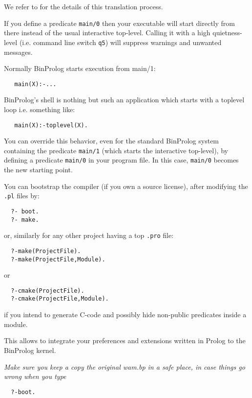 \documentclass{article}
\begin{document}
We refer to \cite{tdb95rev}
for the details of this translation process.

If you define a predicate {\tt main/0} then your
executable will start directly from there instead
of the usual interactive top-level. Calling it with a high
quietness-level (i.e. command line switch {\tt \-q5}) will
suppress warnings and unwanted messages.

{\flushleft Normally} BinProlog starts execution from main/1:

\begin{verbatim}
   main(X):-...
\end{verbatim}

{\flushleft BinProlog's} shell
is nothing but such an application which
starts with a toplevel loop i.e. something like:

\begin{verbatim}
   main(X):-toplevel(X).
\end{verbatim}

{\flushleft You} can override this behavior, even
for the standard BinProlog system containing the predicate {\tt main/1} (which
starts the interactive top-level), by defining a predicate {\tt main/0} in your
program file. In this case, {\tt main/0} becomes the new starting point.

{\flushleft You} can bootstrap the compiler (if you own a source license), after modifying the 
{\tt *.pl} files by:

\begin{verbatim}
  ?- boot.
  ?- make.
\end{verbatim}

or, similarly for any other project having a top {\tt *.pro} file:

\begin{verbatim}
  ?-make(ProjectFile).
  ?-make(ProjectFile,Module).
\end{verbatim}

or

\begin{verbatim}
  ?-cmake(ProjectFile).
  ?-cmake(ProjectFile,Module).
\end{verbatim}

if you intend to generate C-code and possibly hide non-public predicates
inside a module.

{\flushleft This} allows to integrate your preferences and extensions
written in Prolog to the BinProlog kernel.

{\em {\flushleft Make} sure you keep a copy the original 
{\em wam.bp} in a safe place, in case things go wrong when you type}
\begin{verbatim}
  ?-boot.
\end{verbatim}
\end{document}
